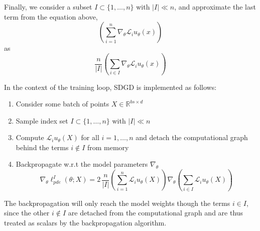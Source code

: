 Finally, we consider a subset $I \subset \{1, \dots, n\}$ with $|I| \ll n$, and approximate the last term from the equation above,
$$
\left( \sum_{i=1}^n \nabla_\theta \mathcal{L}_i u_\theta(x) \right)
$$
as
$$
\frac{n}{|I|} \left( \sum_{i \in I} \nabla_\theta \mathcal{L}_i u_\theta(x) \right)
$$


In the context of the training loop, SDGD is implemented as follows:

\begin{enumerate}
\item Consider some batch of points $X\in\mathbb{R}^{bs\times d}$
\item Sample index set $I \subset \{1, \dots, n\}$ with $|I| \ll n$
\item Compute $\mathcal{L}_i u_\theta(X)$ for all $i=1,\dots,n$ and detach the computational graph behind the terms $i\notin I$ from memory
\item Backpropagate w.r.t the model parameters $\nabla_\theta$
$$
\nabla_\theta \ell_{pde}^I(\theta;X) = 2\,\frac{n}{|I|} \left( \sum_{i=1}^n \mathcal{L}_i u_\theta(X) \right) \nabla_\theta \left( \sum_{i \in I} \mathcal{L}_i u_\theta(X) \right)
$$
\end{enumerate}
The backpropagation will only reach the model weights though the terms $i \in I$,
since the other $i\notin I$ are detached from the computational graph
and are thus treated as scalars by the backpropagation algorithm.




%
%
%
%
%
%


